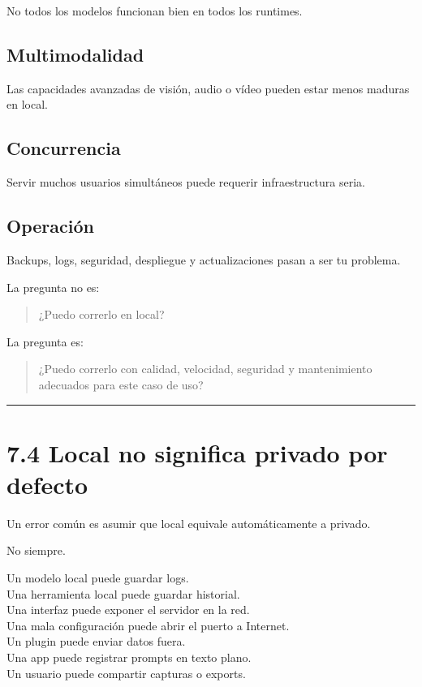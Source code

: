 No todos los modelos funcionan bien en todos los runtimes.

\subsection{Multimodalidad}\label{multimodalidad-3}

Las capacidades avanzadas de visión, audio o vídeo pueden estar menos
maduras en local.

\subsection{Concurrencia}\label{concurrencia}

Servir muchos usuarios simultáneos puede requerir infraestructura seria.

\subsection{Operación}\label{operaciuxf3n}

Backups, logs, seguridad, despliegue y actualizaciones pasan a ser tu
problema.

La pregunta no es:

\begin{quote}
¿Puedo correrlo en local?
\end{quote}

La pregunta es:

\begin{quote}
¿Puedo correrlo con calidad, velocidad, seguridad y mantenimiento
adecuados para este caso de uso?
\end{quote}

\begin{center}\rule{0.5\linewidth}{0.5pt}\end{center}

\section{7.4 Local no significa privado por
defecto}\label{local-no-significa-privado-por-defecto}

Un error común es asumir que local equivale automáticamente a privado.

No siempre.

Un modelo local puede guardar logs.\\
Una herramienta local puede guardar historial.\\
Una interfaz puede exponer el servidor en la red.\\
Una mala configuración puede abrir el puerto a Internet.\\
Un plugin puede enviar datos fuera.\\
Una app puede registrar prompts en texto plano.\\
Un usuario puede compartir capturas o exports.

